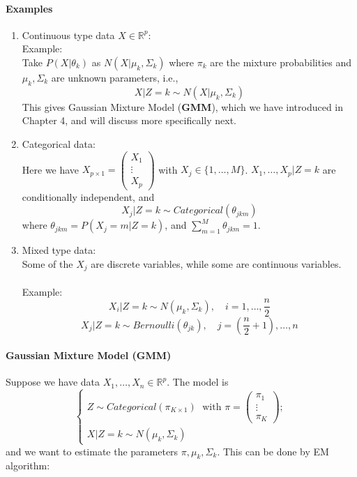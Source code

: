 \documentclass[12pt]{book}
\theoremstyle{definition}
\theoremstyle{remark}
\newcommand{\R}{\mathbb{R}}
\begin{document}
\paragraph{Examples}
\begin{enumerate}
    \item Continuous type data $X\in \R^p$:\\
    Example:\\
    Take $P(X|\theta_k)$ as $N(X|\mu_k,\Sigma_k)$ where $\pi_k$ are the mixture probabilities and $\mu_k, \Sigma_k$ are unknown parameters, i.e.,
    \[X|Z = k \sim N(X|\mu_k, \Sigma_k)\]
    This gives Gaussian Mixture Model (\textbf{GMM}), which we have introduced in Chapter 4, and will discuss more specifically next. 
    \item Categorical data:\\
    Here we have $X_{p\times1} = \begin{pmatrix}
        X_1\\\vdots\\X_p
    \end{pmatrix}$ with $X_j \in \{1,\dots, M\}$. $X_1,\dots,X_p|Z = k$ are conditionally independent, and 
    \[X_j|Z=k \sim Categorical(\theta_{jkm})\]
    where $\theta_{jkm} = P(X_j = m|Z=k)$, and $\sum_{m=1}^M\theta_{jkm} = 1$.
    \item Mixed type data:\\
    Some of the $X_j$ are discrete variables, while some are continuous variables. \\
    \\
    Example: 
    \[X_i|Z=k \sim N(\mu_k,\Sigma_k),\quad i  = 1,\dots, \frac n2\]
    \[X_j|Z = k \sim Bernoulli(\theta_{jk}), \quad j = (\frac n2+1), \dots, n\]
\end{enumerate}


\paragraph{Gaussian Mixture Model (GMM)}
Suppose we have data $X_1,\dots,X_n \in \R^p$. The model is 
\[\begin{cases}
    Z \sim Categorical(\pi_{K\times 1}) \;\text{ with } \pi = \begin{pmatrix}
        \pi_1\\\vdots\\\pi_K
    \end{pmatrix};\\
    X|Z = k \sim N(\mu_k,\Sigma_k)
\end{cases}\]
and we want to estimate the parameters $\pi, \mu_k, \Sigma_k$. This can be done by EM algorithm:\\
\end{document}
